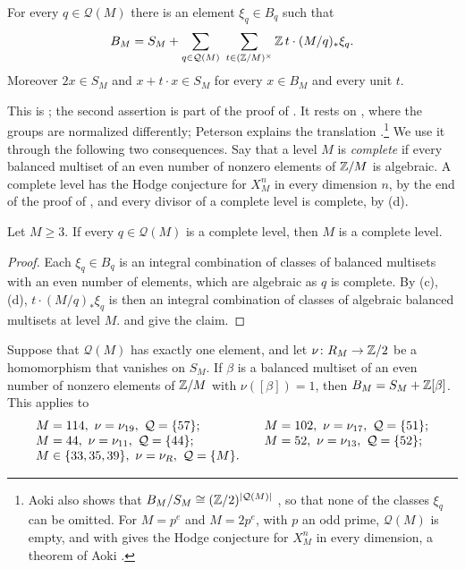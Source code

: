 \begin{theorem}[Aoki]\label{thm:aoki}
For every $q\in\mathcal Q(M)$ there is an element $\xi_{q}\in B_{q}$ such that
\[
  B_{M}=S_{M}+\sum_{q\in\mathcal Q(M)}\ \sum_{t\in(\mathbb{Z}/M)^{\times}}
  \mathbb{Z}\,t\cdot(M/q)_{*}\xi_{q}.
\]
Moreover $2x\in S_{M}$ and $x+t\cdot x\in S_{M}$ for every $x\in B_{M}$ and
every unit $t$.
\end{theorem}

This is \cite[Theorem~2.1]{Aok00}; the second assertion is part of the proof
of \cite[Corollary~2.3]{Aok00}. It rests on \cite[Theorem~D]{Aok83}, where
the groups are normalized differently; Peterson explains the translation
\cite[\S5.2]{Pet26}.\footnote{Aoki also shows that $B_{M}/S_{M}\cong
(\mathbb{Z}/2)^{|\mathcal Q(M)|}$ \cite[Remark~2.4]{Aok00}, so that none of the
classes $\xi_{q}$ can be omitted. For $M=p^{e}$ and $M=2p^{e}$, with $p$ an
odd prime, $\mathcal Q(M)$ is empty, and  with
 gives the Hodge conjecture for $X^{n}_{M}$ in every
dimension, a theorem of Aoki \cite{Aok87,Aok00}.} We use it through the
following two consequences. Say that a level $M$ is \emph{complete} if every
balanced multiset of an even number of nonzero elements of $\mathbb{Z}/M$ is
algebraic. A complete level has the Hodge conjecture for $X^{n}_{M}$ in every
dimension $n$, by the end of the proof of , and every
divisor of a complete level is complete, by (d).

\begin{proposition}\label{prop:complete}
Let $M\ge3$. If every $q\in\mathcal Q(M)$ is a complete level, then $M$ is
a complete level.
\end{proposition}

\begin{proof}
Each $\xi_{q}\in B_{q}$ is an integral combination of classes of balanced
multisets with an even number of elements, which are algebraic as $q$ is
complete. By (c),(d), $t\cdot(M/q)_{*}\xi_{q}$ is then an
integral combination of classes of algebraic balanced multisets at level
$M$.  and  give the claim.
\end{proof}

\begin{corollary}\label{cor:Bone}
Suppose that $\mathcal Q(M)$ has exactly one element, and let $\nu\colon
R_{M}\to\mathbb{Z}/2$ be a homomorphism that vanishes on $S_{M}$. If $\beta$ is a
balanced multiset of an even number of nonzero elements of $\mathbb{Z}/M$ with
$\nu([\beta])=1$, then $B_{M}=S_{M}+\mathbb{Z}[\beta]$. This applies to
\[
\begin{array}{@{}l@{\qquad}l@{}}
  M=114,\ \nu=\nu_{19},\ \mathcal Q=\{57\}; & M=102,\ \nu=\nu_{17},\
  \mathcal Q=\{51\};\\
  M=44,\ \nu=\nu_{11},\ \mathcal Q=\{44\}; & M=52,\ \nu=\nu_{13},\
  \mathcal Q=\{52\};\\
  M\in\{33,35,39\},\ \nu=\nu_{R},\ \mathcal Q=\{M\}. &
\end{array}
\]
\end{corollary}

